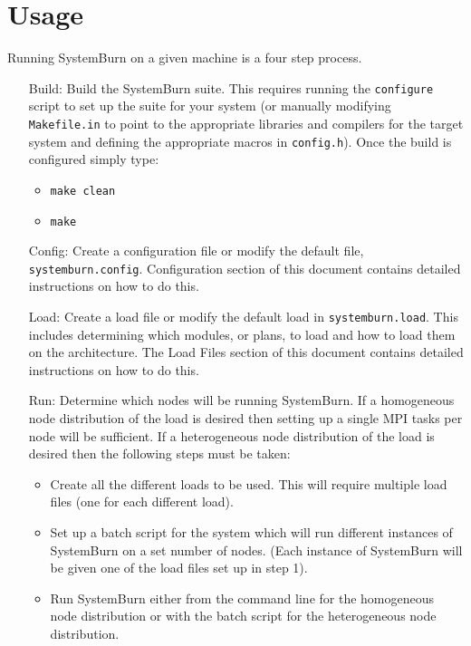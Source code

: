 \section{Usage}


Running SystemBurn on a given machine is a four step process.
\begin{itemize}
	\item[Build:] Build the SystemBurn suite. This 
	requires running the \verb!configure! script to set up the suite
	for your system (or manually modifying \verb!Makefile.in! to 
	point to the appropriate libraries and compilers for the target
	system and defining the appropriate macros in \verb!config.h!).
	Once the build is configured simply type:
	\begin{itemize}
		\item \verb!make clean!
		\item \verb!make!
	\end{itemize}
	\item[Config:] Create a configuration file or modify the default
	file, \verb!systemburn.config!. Configuration section of this
	document contains detailed instructions on how to do this.
	\item[Load:] Create a load file or modify the default load in
	\verb!systemburn.load!. This includes determining which modules,
	or plans, to load and how to load them on the architecture.
	The Load Files section of this document contains detailed
	instructions on how to do this.
	\item[Run:] Determine which nodes will be running SystemBurn. If
	a homogeneous node distribution of the load is desired then
	setting up a single MPI tasks per node will be sufficient. If
	a heterogeneous node distribution of the load is desired then
	the following steps must be taken:
	\begin{itemize}
		\item Create all the different loads to be used. This will
		require multiple load files (one for each different load).
		\item Set up a batch script for the system which will
		run different instances of SystemBurn on a set number
		of nodes. (Each instance of SystemBurn will be given
		one of the load files set up in step 1).
		\item Run SystemBurn either from the command line for
		the homogeneous node distribution or with the batch
		script for the heterogeneous node distribution.
	\end{itemize}
\end{itemize}  
